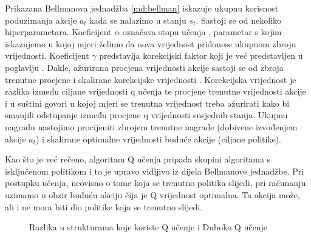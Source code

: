 Prikazana Bellmanova jednadžba \ref{md:bellman} iskazuje ukupnu korisnost poduzimanja akcije $a_t$ kada se nalazimo u stanju $s_t$. Sastoji se od nekoliko hiperparametara. Koeficijent $\alpha$ označava stopu učenja , parametar s kojim iskazujemo u kojoj mjeri želimo da nova vrijednost pridonese ukupnom zbroju vrijednosti. Koeficijent $\gamma$ predstavlja korekcijski faktor  koji je već predstavljen u poglavlju . Dakle, ažurirana procjena vrijednosti akcije sastoji se od zbroja trenutne procjene i skalirane korekcijske vrijednosti . Korekcijska vrijednost je razlika između ciljane vrijednosti q učenja  te procjene trenutne vrijednosti akcije i u suštini govori u kojoj mjeri se trenutna vrijednost treba ažurirati kako bi smanjili odstupanje između procjene q vrijednosti susjednih stanja. Ukupnu nagradu nastojimo procijeniti zbrojem trenutne nagrade (dobivene izvođenjem akcije $a_t$) i skalirane optimalne vrijednosti buduće akcije (ciljane politike). 

Kao što je već rečeno, algoritam Q učenja pripada skupini algoritama s isključenom politikom i to je upravo vidljivo iz dijela Bellmanove jednadžbe. Pri postupku učenja, neovisno o tome koja se trenutno politika slijedi, pri računanju uzimamo u obzir buduću akciju čija je Q vrijednost optimalna. Ta akcija može, ali i ne mora biti dio politike koja se trenutno slijedi. 



\begin{figure}[H]
    \centering
    \caption{Razlika u strukturama koje koriste Q učenje i Duboko Q učenje}
    \label{fig:q-learning}
\end{figure}

